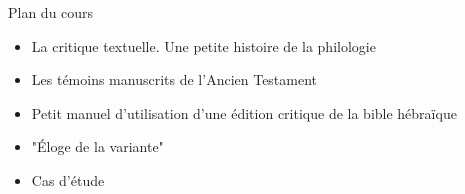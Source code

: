 \documentclass[11pt]{beamer}
\begin{document}
\begin{frame}{Plan du cours}
\begin{itemize}
    \item La critique textuelle. Une petite histoire de la philologie
    \item Les témoins manuscrits de l'Ancien Testament
    \item Petit manuel d'utilisation d'une édition critique de la bible hébraïque
    \item "Éloge de la variante"
    \item Cas d'étude
\end{itemize}
\end{frame}
\end{document}
